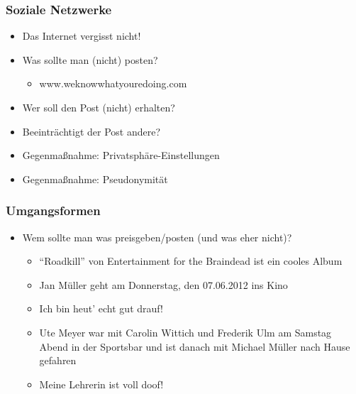\documentclass[12pt]{beamer}
\begin{document}
\begin{frame}
    \frametitle{Soziale Netzwerke}
    \begin{itemize}
        \item<2-> Das Internet vergisst nicht!
        \item<3-> Was sollte man (nicht) posten?
            \begin{itemize}
                \item<4-> www.weknowwhatyouredoing.com
            \end{itemize}
        \item<5-> Wer soll den Post (nicht) erhalten?
        \item<6-> Beeinträchtigt der Post andere?
        \item<7-> Gegenmaßnahme: Privatsphäre-Einstellungen
        \item<8-> Gegenmaßnahme: Pseudonymität
    \end{itemize}
\end{frame}

\begin{frame}
  \frametitle{Umgangsformen}
  \begin{itemize}
    \item Wem sollte man was preisgeben/posten (und was eher nicht)?
      \begin{itemize}
        \item<2-> "`Roadkill"' von Entertainment for the Braindead ist ein cooles Album
        \item<3-> Jan Müller geht am Donnerstag, den 07.06.2012 ins Kino
        \item<4-> Ich bin heut' echt gut drauf!
        \item<5-> Ute Meyer war mit Carolin Wittich und Frederik Ulm am Samstag Abend in der Sportsbar und ist danach mit Michael Müller nach Hause gefahren
        \item<6-> Meine Lehrerin ist voll doof!
      \end{itemize}
  \end{itemize}
\end{frame}
\end{document}
